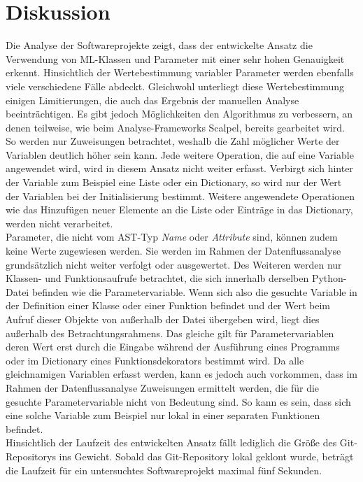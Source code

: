 \documentclass[german,bachelor]{swsLeipzig}
\begin{document}
\section{Diskussion}
Die Analyse der Softwareprojekte zeigt, dass der entwickelte Ansatz die Verwendung von ML-Klassen und Parameter
mit einer sehr hohen Genauigkeit erkennt.
Hinsichtlich der Wertebestimmung variabler Parameter werden ebenfalls viele verschiedene Fälle abdeckt.
Gleichwohl unterliegt diese Wertebestimmung einigen Limitierungen, die auch das Ergebnis der manuellen Analyse beeinträchtigen.
Es gibt jedoch Möglichkeiten den Algorithmus zu verbessern, an denen teilweise, wie beim
Analyse-Frameworks Scalpel, bereits gearbeitet wird.
So werden nur Zuweisungen betrachtet, weshalb die Zahl möglicher Werte der Variablen deutlich höher sein kann.
Jede weitere Operation, die auf eine Variable angewendet wird, wird in diesem Ansatz nicht weiter erfasst.
Verbirgt sich hinter der Variable zum Beispiel eine Liste oder ein Dictionary, so wird nur der Wert der Variablen bei der
Initialisierung bestimmt.
Weitere angewendete Operationen wie das Hinzufügen neuer Elemente an die Liste oder Einträge in das Dictionary,
werden nicht verarbeitet.\\

Parameter, die nicht vom AST-Typ \textit{Name} oder \textit{Attribute} sind, können zudem keine Werte zugewiesen werden.
Sie werden im Rahmen der Datenflussanalyse grundsätzlich nicht weiter verfolgt oder ausgewertet.
Des Weiteren werden nur Klassen- und Funktionsaufrufe betrachtet, die sich innerhalb derselben Python-Datei befinden wie die Parametervariable.
Wenn sich also die gesuchte Variable in der Definition einer Klasse oder einer Funktion befindet und der Wert beim Aufruf
dieser Objekte von außerhalb der Datei übergeben wird, liegt dies außerhalb des Betrachtungsrahmens.
Das gleiche gilt für Parametervariablen deren Wert erst durch die Eingabe während der Ausführung eines Programms
oder im Dictionary eines Funktionsdekorators bestimmt wird.
Da alle gleichnamigen Variablen erfasst werden, kann es jedoch auch vorkommen, dass im Rahmen der Datenflussanalyse
Zuweisungen ermittelt werden, die für die gesuchte Parametervariable nicht von Bedeutung sind.
So kann es sein, dass sich eine solche Variable zum Beispiel nur lokal in einer separaten Funktionen befindet.\\

Hinsichtlich der Laufzeit des entwickelten Ansatz fällt lediglich die Größe des Git-Repositorys ins Gewicht.
Sobald das Git-Repository lokal geklont wurde, beträgt die Laufzeit für ein untersuchtes Softwareprojekt maximal fünf Sekunden.
\end{document}

